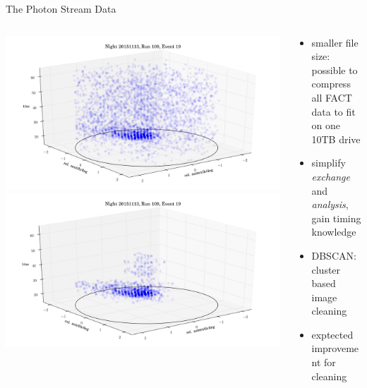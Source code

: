\begin{frame}[c]{The Photon Stream Data}
\begin{columns}[onlytextwidth]
    \begin{column}{0.475\textwidth}
        \begin{overprint}
            \includegraphics[width=1.2\textwidth]{fig/event2.png}
            \includegraphics[width=1.2\textwidth]{fig/event1.png}
        \end{overprint}
    \end{column}
    \begin{column}{0.475\textwidth}
        \begin{itemize}
            \item smaller file size: possible to compress all FACT data to fit on one 10TB drive
            \item simplify \textit{exchange} and \textit{analysis}, gain timing knowledge
            \item DBSCAN: cluster based image cleaning
            \item exptected improvement for cleaning
        \end{itemize}
    \end{column}
\end{columns}
\end{frame}




